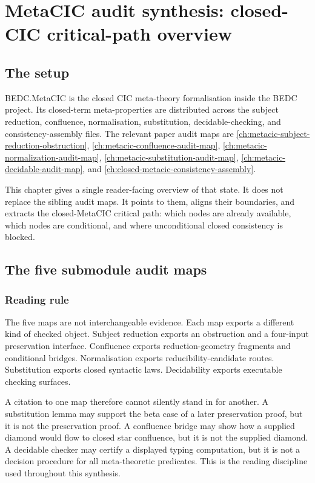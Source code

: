 \chapter{MetaCIC audit synthesis: closed-CIC critical-path overview}
\label{ch:metacic-audit-synthesis}

\section{The setup}
\label{sec:metacic-audit-synthesis-setup}

BEDC.MetaCIC is the closed CIC meta-theory formalisation inside the BEDC
project. Its closed-term meta-properties are distributed across the subject
reduction, confluence, normalisation, substitution, decidable-checking, and
consistency-assembly files. The relevant paper audit maps are
\autoref{ch:metacic-subject-reduction-obstruction},
\autoref{ch:metacic-confluence-audit-map},
\autoref{ch:metacic-normalization-audit-map},
\autoref{ch:metacic-substitution-audit-map},
\autoref{ch:metacic-decidable-audit-map}, and
\autoref{ch:closed-metacic-consistency-assembly}.

This chapter gives a single reader-facing overview of that state. It does not
replace the sibling audit maps. It points to them, aligns their boundaries, and
extracts the closed-MetaCIC critical path: which nodes are already available,
which nodes are conditional, and where unconditional closed consistency is
blocked.

\section{The five submodule audit maps}
\label{sec:metacic-audit-synthesis-five-maps}

\subsection{Reading rule}
\label{subsec:metacic-audit-synthesis-reading-rule}

The five maps are not interchangeable evidence. Each map exports a different
kind of checked object. Subject reduction exports an obstruction and a
four-input preservation interface. Confluence exports reduction-geometry
fragments and conditional bridges. Normalisation exports reducibility-candidate
routes. Substitution exports closed syntactic laws. Decidability exports
executable checking surfaces.

A citation to one map therefore cannot silently stand in for another. A
substitution lemma may support the beta case of a later preservation proof, but
it is not the preservation proof. A confluence bridge may show how a supplied
diamond would flow to closed star confluence, but it is not the supplied
diamond. A decidable checker may certify a displayed typing computation, but it
is not a decision procedure for all meta-theoretic predicates. This is the
reading discipline used throughout this synthesis.


